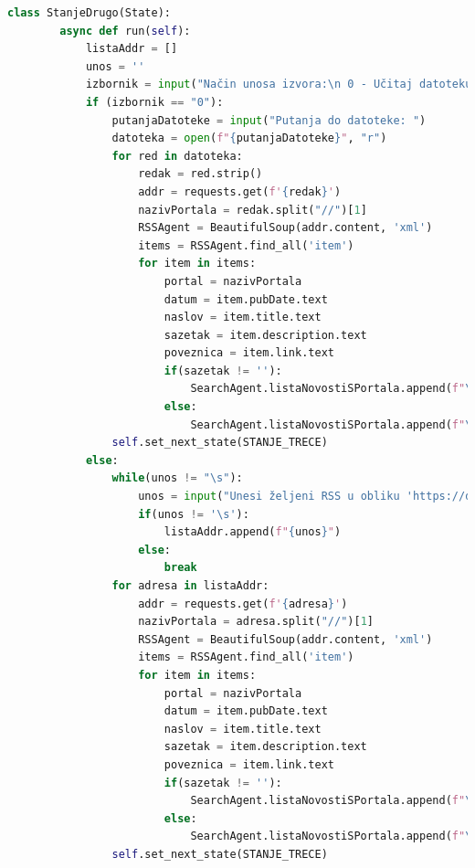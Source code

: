 \documentclass[]{foi} %
\begin{document}
\begin{lstlisting}[language=Python, caption={Programski kôd za RSSAgent agenta}]
    class StanjeDrugo(State):
        async def run(self):
            listaAddr = []
            unos = ''
            izbornik = input("Način unosa izvora:\n 0 - Učitaj datoteku (.txt) s RSS izvorima [struktura datoteke: svaki izvor u svoj zaseban redak] (preporuka) \n 1 - direktan unos putem terminala \n\n Vaš izbor: ")
            if (izbornik == "0"):
                putanjaDatoteke = input("Putanja do datoteke: ")
                datoteka = open(f"{putanjaDatoteke}", "r")
                for red in datoteka:
                    redak = red.strip()
                    addr = requests.get(f'{redak}')
                    nazivPortala = redak.split("//")[1]
                    RSSAgent = BeautifulSoup(addr.content, 'xml')
                    items = RSSAgent.find_all('item')
                    for item in items:
                        portal = nazivPortala
                        datum = item.pubDate.text
                        naslov = item.title.text
                        sazetak = item.description.text
                        poveznica = item.link.text
                        if(sazetak != ''):
                            SearchAgent.listaNovostiSPortala.append(f"\n\nPortal: {portal}\n\nDatum: {datum}.\n\nNaslov: {naslov}\n\nSažetak: {sazetak}\n\nPoveznica: {poveznica}\n\n--------------------------------------------------")
                        else:
                            SearchAgent.listaNovostiSPortala.append(f"\n\nPortal: {portal}\n\nDatum: {datum}.\n\nNaslov: {naslov}\n\nPoveznica: {poveznica}\n\n--------------------------------------------------")
                self.set_next_state(STANJE_TRECE)
            else:
                while(unos != "\s"):
                    unos = input("Unesi željeni RSS u obliku 'https://domain-name.xyz' (\"\\s\" - prekid unosa): ")
                    if(unos != '\s'):
                        listaAddr.append(f"{unos}")
                    else:
                        break
                for adresa in listaAddr:    
                    addr = requests.get(f'{adresa}')
                    nazivPortala = adresa.split("//")[1]
                    RSSAgent = BeautifulSoup(addr.content, 'xml')
                    items = RSSAgent.find_all('item')
                    for item in items:
                        portal = nazivPortala
                        datum = item.pubDate.text
                        naslov = item.title.text
                        sazetak = item.description.text
                        poveznica = item.link.text
                        if(sazetak != ''):
                            SearchAgent.listaNovostiSPortala.append(f"\n\nPortal: {portal}\n\nDatum: {datum}.\n\nNaslov: {naslov}\n\nSažetak: {sazetak}\n\nPoveznica: {poveznica}\n\n--------------------------------------------------")
                        else:
                            SearchAgent.listaNovostiSPortala.append(f"\n\nPortal: {portal}\n\nDatum: {datum}.\n\nNaslov: {naslov}\n\nPoveznica: {poveznica}\n\n--------------------------------------------------")
                self.set_next_state(STANJE_TRECE)
    

\end{lstlisting}
\end{document}
